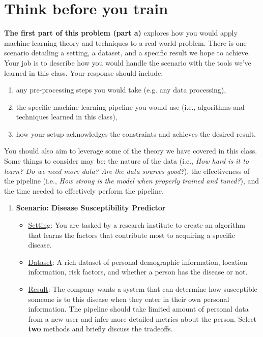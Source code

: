 \documentclass{article}
\begin{document}
\clearpage
\section*{Think before you train}
\begin{aprob} \textbf{The first part of this problem (part a)} explores how you would apply machine learning theory and techniques to a real-world problem. There is one scenario detailing a setting, a dataset, and a specific result we hope to achieve. Your job is to describe how you would handle the scenario with the tools we’ve learned in this class. Your response should include:
\begin{enumerate}[label=(\arabic*),topsep=0.2em,itemsep=-0.2em]
    \item any pre-processing steps you would take (e.g. any data processing),
    \item the specific machine learning pipeline you would use (i.e., algorithms and techniques learned in this class),
    \item how your setup acknowledges the constraints and achieves the desired result.
\end{enumerate}

You should also aim to leverage some of the theory we have covered in this class. Some things to consider may be: the nature of the data (i.e., \textit{How hard is it to learn? Do we need more data? Are the data sources good?}), the effectiveness of the pipeline (i.e., \textit{How strong is the model when properly trained and tuned?}), and the time needed to effectively perform the pipeline.

\begin{enumerate}
    \item {} \textbf{Scenario: Disease Susceptibility Predictor}
\begin{itemize}
    \item \underline{Setting}: You are tasked by a research institute to create an algorithm that learns the factors that contribute most to acquiring a specific disease.
    \item \underline{Dataset}: A rich dataset of personal demographic information, location information, risk factors, and whether a person has the disease or not.
    \item \underline{Result}: The company wants a system that can determine how susceptible someone is to this disease when they enter in their own personal information. The pipeline should take limited amount of personal data from a new user and infer more detailed metrics about the person. Select \textbf{two} methods and briefly discuss the tradeoffs.
\end{itemize}
\end{enumerate}



\end{aprob}
\end{document}
